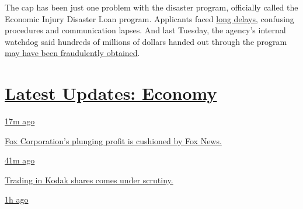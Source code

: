The cap has been just one problem with the disaster program, officially
called the Economic Injury Disaster Loan program. Applicants faced
\href{https://www.nytimes3xbfgragh.onion/2020/04/09/business/smallbusiness/small-business-disaster-loans-coronavirus.html}{long
delays}, confusing procedures and communication lapses. And last
Tuesday, the agency's internal watchdog said hundreds of millions of
dollars handed out through the program
\href{https://www.nytimes3xbfgragh.onion/live/2020/07/28/business/stock-market-today-coronavirus\#thieves-are-targeting-small-business-relief-programs-a-watchdog-says}{may
have been fraudulently obtained}.

\hypertarget{latest-updates-economy}{%
\section{\texorpdfstring{\href{https://www.nytimes3xbfgragh.onion/live/2020/08/04/business/stock-market-today-coronavirus?action=click\&pgtype=Article\&state=default\&region=MAIN_CONTENT_1\&context=storylines_live_updates}{Latest
Updates:
Economy}}{Latest Updates: Economy}}\label{latest-updates-economy}}

\href{https://www.nytimes3xbfgragh.onion/live/2020/08/04/business/stock-market-today-coronavirus?action=click\&pgtype=Article\&state=default\&region=MAIN_CONTENT_1\&context=storylines_live_updates\#fox-corporations-plunging-profit-is-cushioned-by-fox-news}{17m
ago}

\href{https://www.nytimes3xbfgragh.onion/live/2020/08/04/business/stock-market-today-coronavirus?action=click\&pgtype=Article\&state=default\&region=MAIN_CONTENT_1\&context=storylines_live_updates\#fox-corporations-plunging-profit-is-cushioned-by-fox-news}{Fox
Corporation's plunging profit is cushioned by Fox News.}

\href{https://www.nytimes3xbfgragh.onion/live/2020/08/04/business/stock-market-today-coronavirus?action=click\&pgtype=Article\&state=default\&region=MAIN_CONTENT_1\&context=storylines_live_updates\#trading-in-kodak-shares-comes-under-scrutiny}{41m
ago}

\href{https://www.nytimes3xbfgragh.onion/live/2020/08/04/business/stock-market-today-coronavirus?action=click\&pgtype=Article\&state=default\&region=MAIN_CONTENT_1\&context=storylines_live_updates\#trading-in-kodak-shares-comes-under-scrutiny}{Trading
in Kodak shares comes under scrutiny.}

\href{https://www.nytimes3xbfgragh.onion/live/2020/08/04/business/stock-market-today-coronavirus?action=click\&pgtype=Article\&state=default\&region=MAIN_CONTENT_1\&context=storylines_live_updates\#disney-lost-4-7-billion-last-quarter-but-its-newest-business-was-a-big-hit}{1h
ago}

